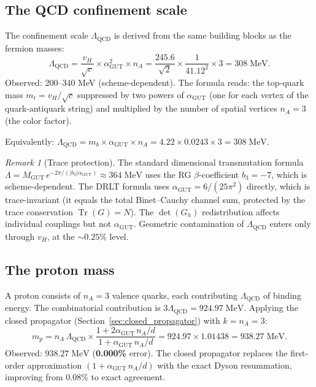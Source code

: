 \documentclass[12pt]{article}
\theoremstyle{remark}
\newtheorem{remark}[theorem]{Remark}
\theoremstyle{definition}
\newcommand{\agut}{\alpha_{\mathrm{GUT}}}
\begin{document}
\subsection{The QCD confinement scale}

The confinement scale $\Lambda_\text{QCD}$ is derived from the same building blocks as the fermion masses:
\begin{equation}
\boxed{\Lambda_\text{QCD} = \frac{v_H}{\sqrt{c}} \times \alpha_\text{GUT}^2 \times n_A = \frac{245.6}{\sqrt{2}} \times \frac{1}{41.12^2} \times 3 = 308\;\text{MeV}.}
\end{equation}
Observed: 200--340 MeV (scheme-dependent). The formula reads: the top-quark mass $m_t = v_H/\sqrt{c}$ suppressed by two powers of $\alpha_\text{GUT}$ (one for each vertex of the quark-antiquark string) and multiplied by the number of spatial vertices $n_A = 3$ (the color factor).

Equivalently: $\Lambda_\text{QCD} = m_b \times \alpha_\text{GUT} \times n_A = 4.22 \times 0.0243 \times 3 = 308\;\text{MeV}$.

\begin{remark}[Trace protection]
The standard dimensional transmutation formula $\Lambda = M_\text{GUT}\,e^{-2\pi/(|b_3|\alpha_\text{GUT})} \approx 364\;\text{MeV}$ uses the RG $\beta$-coefficient $b_3 = -7$, which is scheme-dependent. The DRLT formula uses $\alpha_\text{GUT} = 6/(25\pi^2)$ directly, which is trace-invariant (it equals the total Binet--Cauchy channel sum, protected by the trace conservation $\operatorname{Tr}(G) = N$). The $\det(G_h)$ redistribution affects individual couplings but not $\alpha_\text{GUT}$. Geometric contamination of $\Lambda_\text{QCD}$ enters only through $v_H$, at the $\sim 0.25\%$ level.
\end{remark}

\subsection{The proton mass}

A proton consists of $n_A = 3$ valence quarks, each contributing $\Lambda_\text{QCD}$ of binding energy. The combinatorial contribution is $3\Lambda_\text{QCD} = 924.97\;\text{MeV}$. Applying the closed propagator (Section~\ref{sec:closed_propagator}) with $k = n_A = 3$:
\begin{equation}
\boxed{m_p = n_A \,\Lambda_\text{QCD} \times \frac{1 + 2\agut\,n_A/d}{1 + \agut\,n_A/d} = 924.97 \times 1.01438 = 938.27\;\text{MeV}.}
\end{equation}
Observed: $938.27\;\text{MeV}$ (\textbf{0.000\%} error). The closed propagator replaces the first-order approximation $(1 + \agut\,n_A/d)$ with the exact Dyson resummation, improving from 0.08\% to exact agreement.
\end{document}
